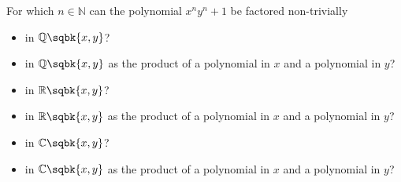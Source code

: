 For which $n \in \mathbb{N}$ can the polynomial $x^{n} y^{n} + 1$ be factored non-trivially
\begin{itemize}
  \item in $\mathbb{Q}\sqbk{x, y}$?
  \item in $\mathbb{Q}\sqbk{x, y}$ as the product of a polynomial in $x$ and a polynomial in $y$?
  \item in $\mathbb{R}\sqbk{x, y}$?
  \item in $\mathbb{R}\sqbk{x, y}$ as the product of a polynomial in $x$ and a polynomial in $y$?
  \item in $\mathbb{C}\sqbk{x, y}$?
  \item in $\mathbb{C}\sqbk{x, y}$ as the product of a polynomial in $x$ and a polynomial in $y$?
\end{itemize}
